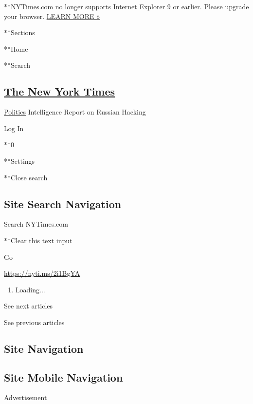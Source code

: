 **NYTimes.com no longer supports Internet Explorer 9 or earlier. Please
upgrade your browser.
\href{http://www.nytimes.com/content/help/site/ie9-support.html}{LEARN
MORE »}

**Sections

**Home

**Search

\hypertarget{the-new-york-times}{%
\subsection{\texorpdfstring{\href{http://www.nytimes.com/}{The New York
Times}}{The New York Times}}\label{the-new-york-times}}

\href{/section/politics}{Politics} \textbar{}Intelligence Report on
Russian Hacking

Log In

**0

**Settings

**Close search

\hypertarget{site-search-navigation}{%
\subsection{Site Search Navigation}\label{site-search-navigation}}

Search NYTimes.com

**Clear this text input

Go

\href{https://nyti.ms/2i1BgYA}{https://nyti.ms/2i1BgYA}

\begin{enumerate}
\def\labelenumi{\arabic{enumi}.}
\item
  Loading...
\end{enumerate}

See next articles

See previous articles

\hypertarget{site-navigation}{%
\subsection{Site Navigation}\label{site-navigation}}

\hypertarget{site-mobile-navigation}{%
\subsection{Site Mobile Navigation}\label{site-mobile-navigation}}

Advertisement

